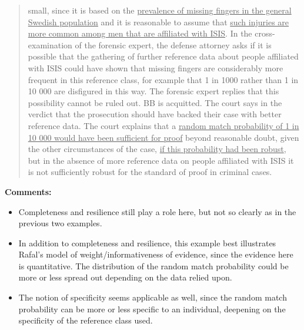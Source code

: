 \documentclass[
  10pt,
  dvipsnames,enabledeprecatedfontcommands]{scrartcl}
\providecommand{\tightlist}{%
  \setlength{\itemsep}{0pt}\setlength{\parskip}{0pt}}
\begin{document}
\begin{quote}
{small}, since it is based on the \underline{prevalence of missing fingers in the general Swedish population}
and it is reasonable to assume that \underline{such injuries are more common among men that are
affiliated with ISIS}. In the cross-examination of the forensic expert, the defense attorney asks if
it is possible that the gathering of further reference data about people affiliated with ISIS could
have shown that missing fingers are considerably more frequent in this reference class, for
example that 1 in 1000 rather than 1 in 10 000 are disfigured in this way. The forensic expert
replies that this possibility cannot be ruled out. BB is acquitted. The court says in the verdict
that the prosecution should have backed their case with better reference data. The court
explains that a \underline{random match probability of 1 in 10 000 would have been sufficient for proof}
beyond reasonable doubt, given the other circumstances of the case, \underline{if this probability had
been robust}, but in the absence of more reference data on people affiliated with ISIS it is not
sufficiently robust for the standard of proof in criminal cases. 
\end{quote}

\textbf{Comments:}

\begin{itemize}
\tightlist
\item
  Completeness and resilience still play a role here, but not so clearly
  as in the previous two examples.
\end{itemize}


\begin{itemize}
\tightlist
\item
  In addition to completeness and resilience, this example best
  illustrates Rafal's model of weight/informativeness of evidence, since
  the evidence here is quantitative. The distribution of the random
  match probability could be more or less spread out depending on the
  data relied upon.
\end{itemize}


\begin{itemize}
\tightlist
\item
  The notion of specificity seems applicable as well, since the random
  match probability can be more or less specific to an individual,
  deepening on the specificity of the reference class used.
\end{itemize}
\end{document}
